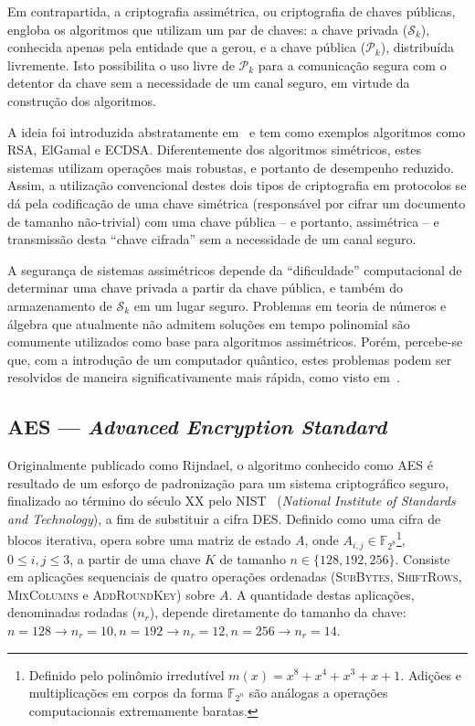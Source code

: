 \documentclass[12pt,notitlepage]{report}
\newcommand{\pk}{\mathcal{P}_k}
\newcommand{\sk}{\mathcal{S}_k}
\begin{document}
Em contrapartida, a criptografia assimétrica, ou criptografia de chaves
públicas, engloba os algoritmos que utilizam um par de chaves: a chave privada
($\sk{}$), conhecida apenas pela entidade que a gerou, e a chave pública
($\pk{}$), distribuída livremente. Isto possibilita o uso livre de $\pk{}$ para
a comunicação segura com o detentor da chave sem a necessidade de um canal
seguro, em virtude da construção dos algoritmos.

A ideia foi introduzida abstratamente em~\cite{Diffie:2006:NDC:2263321.2269104}
e tem como exemplos algoritmos como RSA, ElGamal e ECDSA.
Diferentemente dos algoritmos simétricos, estes sistemas utilizam operações
mais robustas, e portanto de desempenho reduzido. Assim, a utilização
convencional destes dois tipos de criptografia em protocolos se dá pela
codificação de uma chave simétrica (responsável por cifrar um documento
de tamanho não-trivial) com uma chave pública -- e portanto,
assimétrica -- e transmissão desta ``chave cifrada'' sem a necessidade de
um canal seguro.

A segurança de sistemas assimétricos depende da ``dificuldade''
computacional de determinar uma chave privada a partir da chave pública,
e também do armazenamento de $\sk{}$ em um lugar seguro. Problemas em
teoria de números e álgebra que atualmente não admitem soluções em tempo
polinomial são comumente utilizados como base para algoritmos assimétricos.
Porém, percebe-se que, com a introdução de um computador quântico, estes
problemas podem ser resolvidos de maneira significativamente mais rápida,
como visto em~\cite{Shor:1997:PAP:264393.264406}.

\subsection{AES --- \emph{Advanced Encryption Standard}}

Originalmente publicado como Rijndael, o algoritmo conhecido como AES é resultado
de um esforço de padronização para um sistema criptográfico seguro, finalizado
ao término do século XX pelo NIST~\cite{Standards2001} (\emph{National Institute
of Standards and Technology}), a fim de substituir a cifra DES.
Definido como uma cifra de blocos iterativa, opera
sobre uma matriz de estado $A$, onde $A_{i,j} \in 
\mathbb{F}_{2^{8}}$\footnote{Definido pelo polinômio irredutível
$m(x) = x^{8} + x^{4} + x^{3} + x + 1$. Adições e multiplicações em corpos da
forma $\mathbb{F}_{2^n}$ são análogas a operações computacionais extremamente
baratas.}, $0 \leq i, j \leq 3$, a partir de uma chave $K$ de tamanho $n \in \{128, 192,
256\}$. Consiste em aplicações sequenciais de quatro operações ordenadas
(\textsc{SubBytes}, \textsc{ShiftRows}, \textsc{MixColumns} e
\textsc{AddRoundKey}) sobre $A$. A quantidade destas aplicações, denominadas
rodadas ($n_r$), depende diretamente do tamanho da chave: $n = 128 \rightarrow
n_r = 10, n = 192 \rightarrow n_r = 12, n = 256 \rightarrow n_r = 14$.
\end{document}
